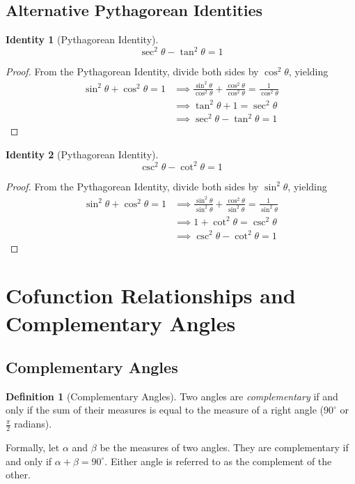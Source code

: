 \documentclass{article}
\theoremstyle{definition}
\newtheorem{definition}{Definition}[]
\theoremstyle{plain}
\newtheorem{identity}{Identity}[]
\begin{document}
\subsection{Alternative Pythagorean Identities}

\begin{identity}[Pythagorean Identity]
    \[
    \sec^2 \theta - \tan^2 \theta = 1
    \]
\end{identity}
\begin{proof}
    From the Pythagorean Identity, divide both sides by $\cos^2 \theta$, yielding
    \begin{align*}
        \sin^2 \theta + \cos^2 \theta = 1 &\implies \frac{\sin^2 \theta}{\cos^2 \theta} + \frac{\cos^2 \theta}{\cos^2 \theta} = \frac{1}{\cos^2 \theta} \\
        &\implies \tan^2 \theta + 1 = \sec^2 \theta \\
        &\implies \sec^2 \theta - \tan^2 \theta = 1
    \end{align*}
\end{proof}

\begin{identity}[Pythagorean Identity]
    \[
    \csc^2 \theta - \cot^2 \theta = 1
    \]
\end{identity}
\begin{proof}
    From the Pythagorean Identity, divide both sides by $\sin^2 \theta$, yielding
    \begin{align*}
        \sin^2 \theta + \cos^2 \theta = 1 &\implies \frac{\sin^2 \theta}{\sin^2 \theta} + \frac{\cos^2 \theta}{\sin^2 \theta} = \frac{1}{\sin^2 \theta} \\
        &\implies 1 + \cot^2 \theta = \csc^2 \theta \\
        &\implies \csc^2 \theta - \cot^2 \theta = 1
    \end{align*}
\end{proof}

\section{Cofunction Relationships and Complementary Angles}

\subsection{Complementary Angles}

\begin{definition}[Complementary Angles]
    Two angles are \emph{complementary} if and only if the sum of their measures is equal to the measure of a right angle ($90^\circ$ or $\frac{\pi}{2}$ radians).

    Formally, let $\alpha$ and $\beta$ be the measures of two angles. They are complementary if and only if $\alpha + \beta = 90^\circ$. Either angle is referred to as the complement of the other.
\end{definition}
\end{document}
